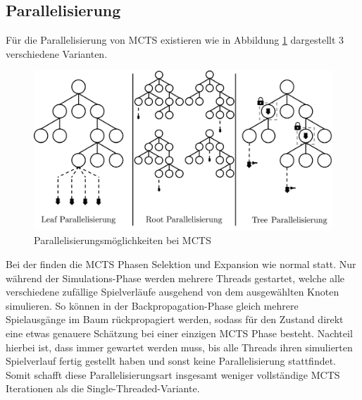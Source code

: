 \subsection{Parallelisierung}

Für die Parallelisierung von \ac{MCTS} existieren wie in Abbildung \ref{fig:mcts-parallization} dargestellt 3 verschiedene Varianten.

\vspace*{-0.3cm}
\begin{figure}[!ht]
    \centering
    \includegraphics[width=\textwidth]{res/pictures/mcts-parallization.pdf}
    \vspace*{-0.75cm}
    \caption[Parallelisierungsmöglichkeiten bei MCTS]{Parallelisierungsmöglichkeiten bei \acs{MCTS}}
    \label{fig:mcts-parallization}
\end{figure}
\vspace*{-0.15cm}

Bei der  finden die \ac{MCTS} Phasen Selektion und Expansion wie normal statt. Nur während der Simulations-Phase werden mehrere Threads gestartet, welche alle verschiedene zufällige Spielverläufe ausgehend von dem ausgewählten Knoten simulieren. So können in der Backpropagation-Phase gleich mehrere Spielausgänge im Baum rückpropagiert werden, sodass für den Zustand direkt eine etwas genauere Schätzung bei einer einzigen \ac{MCTS} Phase besteht. Nachteil hierbei ist, dass immer gewartet werden muss, bis alle Threads ihren simulierten Spielverlauf fertig gestellt haben und sonst keine Parallelisierung stattfindet. Somit schafft diese Parallelisierungsart insgesamt weniger vollständige \ac{MCTS} Iterationen als die Single-Threaded-Variante. \cite[S. 204]{2016.HybridMCTS}

\vspace*{-5cm}

